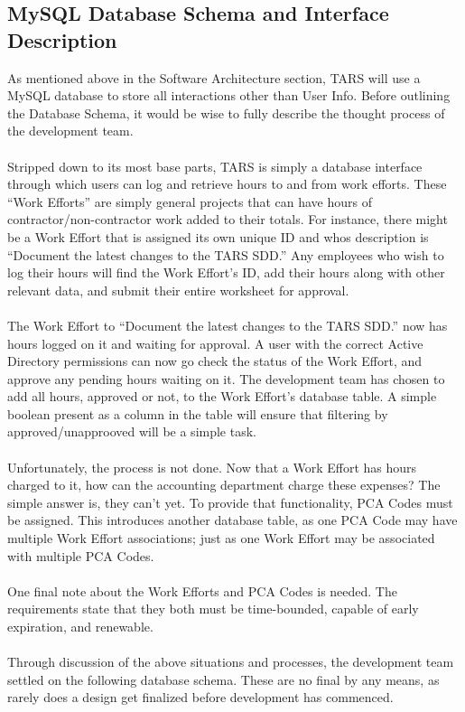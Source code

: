 \documentclass[letterpaper]{article}
\begin{document}
\subsection{MySQL Database Schema and Interface Description}
As mentioned above in the Software Architecture section, TARS will use a MySQL database to store all interactions other than User Info. Before outlining the Database Schema, it would be wise to fully describe the thought process of the development team.\\
\\
Stripped down to its most base parts, TARS is simply a database interface through which users can log and retrieve hours to and from work efforts. These ``Work Efforts'' are simply general projects that can have hours of contractor/non-contractor work added to their totals. For instance, there might be a Work Effort that is assigned its own unique ID and whos description is ``Document the latest changes to the TARS SDD.'' Any employees who wish to log their hours will find the Work Effort's ID, add their hours along with other relevant data, and submit their entire worksheet for approval. \\
\\
The Work Effort to ``Document the latest changes to the TARS SDD.'' now has hours logged on it and waiting for approval. A user with the correct Active Directory permissions can now go check the status of the Work Effort, and approve any pending hours waiting on it. The development team has chosen to add all hours, approved or not, to the Work Effort's database table. A simple boolean present as a column in the table will ensure that filtering by approved/unapprooved will be a simple task.\\
\\
Unfortunately, the process is not done. Now that a Work Effort has hours charged to it, how can the accounting department charge these expenses? The simple answer is, they can't yet. To provide that functionality, PCA Codes must be assigned. This introduces another database table, as one PCA Code may have multiple Work Effort associations; just as one Work Effort may be associated with multiple PCA Codes.\\
\\
One final note about the Work Efforts and PCA Codes is needed. The requirements state that they both must be time-bounded, capable of early expiration, and renewable. \\
\\
Through discussion of the above situations and processes, the development team settled on the following database schema. These are no final by any means, as rarely does a design get finalized before development has commenced.\\
\\
\end{document}

